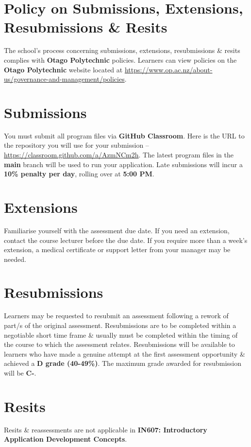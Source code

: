 \documentclass{article}
\begin{document}
\section*{Policy on Submissions, Extensions, Resubmissions \& Resits}
The school's process concerning submissions, extensions, resubmissions \& resits complies with \textbf{Otago Polytechnic} policies. Learners can view policies on the \textbf{Otago Polytechnic} website located at \href{https://www.op.ac.nz/about-us/governance-and-management/policies}{https://www.op.ac.nz/about-us/governance-and-management/policies}.

\section*{Submissions}
You must submit all program files via \textbf{GitHub Classroom}. Here is the URL to the repository you will use for your submission – \href{https://classroom.github.com/a/AzmNCm2h}{https://classroom.github.com/a/AzmNCm2h}. The latest program files in the \textbf{main} branch will be used to run your application. Late submissions will incur a \textbf{10\% penalty per day}, rolling over at \textbf{5:00 PM}.

\section*{Extensions}
Familiarise yourself with the assessment due date. If you need an extension, contact the course lecturer before the due date. If you require more than a week's extension, a medical certificate or support letter from your manager may be needed.

\section*{Resubmissions}
Learners may be requested to resubmit an assessment following a rework of part/s of the original assessment. Resubmissions are to be completed within a negotiable short time frame \& usually must be completed within the timing of the course to which the assessment relates. Resubmissions will be available to learners who have made a genuine attempt at the first assessment opportunity \& achieved a \textbf{D grade (40-49\%)}. The maximum grade awarded for resubmission will be \textbf{C-}.

\section*{Resits}
Resits \& reassessments are not applicable in \textbf{IN607: Introductory Application Development Concepts}. 
\end{document}
